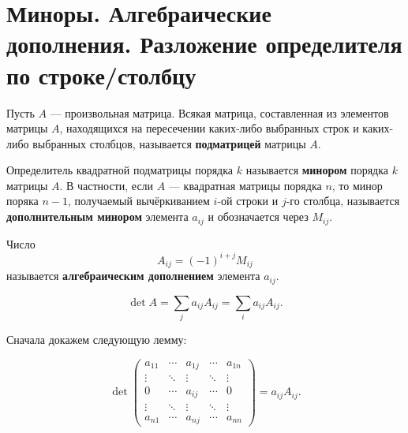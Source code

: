 \section{Миноры. Алгебраические дополнения. Разложение определителя по строке/столбцу}

\begin{definition}
    Пусть $A$ --- произвольная матрица. Всякая матрица, составленная из элементов матрицы $A$, находящихся на пересечении каких-либо выбранных строк и каких-либо выбранных столбцов, называется \textbf{подматрицей} матрицы $A$.
\end{definition}

\begin{definition}
    Определитель квадратной подматрицы порядка $k$ называется \textbf{минором} порядка $k$ матрицы $A$. В частности, если $A$ --- квадратная матрицы порядка $n$, то минор поряка $n - 1$, получаемый вычёркиванием $i$-ой строки и $j$-го столбца, называется \textbf{дополнительным минором} элемента $a_{ij}$ и обозначается через $M_{ij}$.
\end{definition}

\begin{definition}
    Число 
    $$
    A_{ij} = (-1)^{i + j}M_{ij}
    $$
    называется \textbf{алгебраическим дополнением} элемента $a_{ij}$.
\end{definition}

\begin{theorem}
    $$
    \det A = \sum_{j}a_{ij}A_{ij} = \sum_{i}a_{ij}A_{ij}.
    $$
\end{theorem}

Сначала докажем следующую лемму:

\begin{lemma}
    $$
    \det
    \begin{pmatrix}
        a_{11} & \cdots & a_{1j} & \cdots & a_{1n}\\
        \vdots & \ddots & \vdots & \ddots & \vdots\\
        0      & \cdots & a_{ij} & \cdots & 0     \\
        \vdots & \ddots & \vdots & \ddots & \vdots\\
        a_{n1} & \cdots & a_{nj} & \cdots & a_{nn}
    \end{pmatrix} = a_{ij}A_{ij}.
    $$
\end{lemma}

